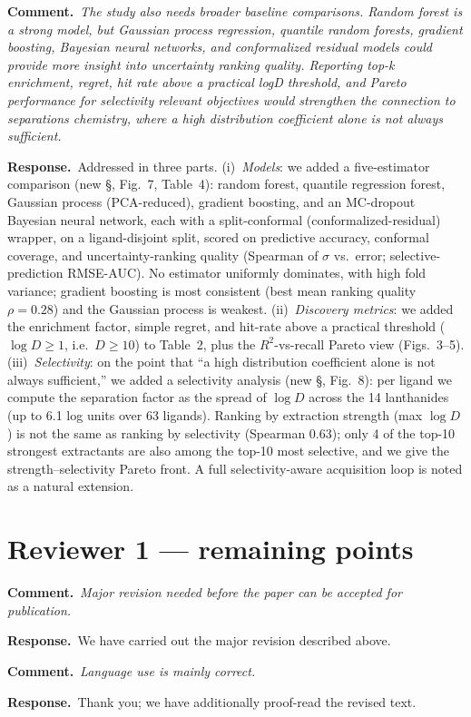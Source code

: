 \documentclass[11pt]{article}
\newcommand{\rev}[1]{\begingroup\itshape\color{gray}#1\endgroup}
\newcommand{\resp}{\par\noindent\textbf{Response.}\ }
\newcommand{\cmt}[1]{\par\vspace{4pt}\noindent\textbf{Comment.}\ \rev{#1}\par\vspace{2pt}}
\begin{document}
\cmt{The study also needs broader baseline comparisons. Random forest is a strong model,
but Gaussian process regression, quantile random forests, gradient boosting, Bayesian
neural networks, and conformalized residual models could provide more insight into
uncertainty ranking quality. Reporting top-k enrichment, regret, hit rate above a
practical logD threshold, and Pareto performance for selectivity relevant objectives
would strengthen the connection to separations chemistry, where a high distribution
coefficient alone is not always sufficient.}
\resp Addressed in three parts. (i)~\emph{Models}: we added a five-estimator comparison
(new \S, Fig.~7, Table~4): random forest, quantile regression forest, Gaussian process
(PCA-reduced), gradient boosting, and an MC-dropout Bayesian neural network, each with a
split-conformal (conformalized-residual) wrapper, on a ligand-disjoint split, scored on
predictive accuracy, conformal coverage, and uncertainty-ranking quality (Spearman of
$\sigma$ vs.\ error; selective-prediction RMSE-AUC). No estimator uniformly dominates,
with high fold variance; gradient boosting is most consistent (best mean ranking quality
$\rho=0.28$) and the Gaussian process is weakest. (ii)~\emph{Discovery metrics}: we
added the enrichment factor, simple regret, and hit-rate above a practical threshold
($\log D\ge1$, i.e.\ $D\ge10$) to Table~2, plus the $R^2$-vs-recall Pareto view
(Figs.~3--5). (iii)~\emph{Selectivity}: on the point that ``a high distribution
coefficient alone is not always sufficient,'' we added a selectivity analysis (new \S,
Fig.~8): per ligand we compute the separation factor as the spread of $\log D$ across
the 14 lanthanides (up to 6.1 log units over 63 ligands). Ranking by extraction strength
(max $\log D$) is not the same as ranking by selectivity (Spearman 0.63); only 4 of the
top-10 strongest extractants are also among the top-10 most selective, and we give the
strength--selectivity Pareto front. A full selectivity-aware acquisition loop is noted
as a natural extension.

\section*{Reviewer 1 --- remaining points}

\cmt{Major revision needed before the paper can be accepted for publication.}
\resp We have carried out the major revision described above.

\cmt{Language use is mainly correct.}
\resp Thank you; we have additionally proof-read the revised text.
\end{document}
